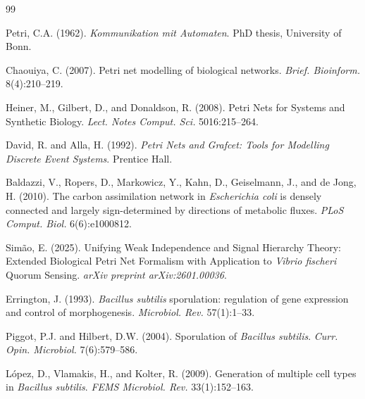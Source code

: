 \documentclass[twocolumn,11pt]{article}
\begin{document}

\begin{thebibliography}{99}
\setlength{\itemsep}{3pt}

Petri, C.A. (1962).
\newblock \textit{Kommunikation mit Automaten}.
\newblock PhD thesis, University of Bonn.

Chaouiya, C. (2007).
\newblock Petri net modelling of biological networks.
\newblock \textit{Brief. Bioinform.} 8(4):210--219.

Heiner, M., Gilbert, D., and Donaldson, R. (2008).
\newblock Petri Nets for Systems and Synthetic Biology.
\newblock \textit{Lect. Notes Comput. Sci.} 5016:215--264.

David, R. and Alla, H. (1992).
\newblock \textit{Petri Nets and Grafcet: Tools for Modelling Discrete Event Systems}.
\newblock Prentice Hall.

Baldazzi, V., Ropers, D., Markowicz, Y., Kahn, D., Geiselmann, J., and de Jong, H. (2010).
\newblock The carbon assimilation network in \textit{Escherichia coli} is densely connected and largely sign-determined by directions of metabolic fluxes.
\newblock \textit{PLoS Comput. Biol.} 6(6):e1000812.

Simão, E. (2025).
\newblock Unifying Weak Independence and Signal Hierarchy Theory: Extended Biological Petri Net Formalism with Application to \textit{Vibrio fischeri} Quorum Sensing.
\newblock \textit{arXiv preprint arXiv:2601.00036}.

Errington, J. (1993).
\newblock \textit{Bacillus subtilis} sporulation: regulation of gene expression and control of morphogenesis.
\newblock \textit{Microbiol. Rev.} 57(1):1--33.

Piggot, P.J. and Hilbert, D.W. (2004).
\newblock Sporulation of \textit{Bacillus subtilis}.
\newblock \textit{Curr. Opin. Microbiol.} 7(6):579--586.

López, D., Vlamakis, H., and Kolter, R. (2009).
\newblock Generation of multiple cell types in \textit{Bacillus subtilis}.
\newblock \textit{FEMS Microbiol. Rev.} 33(1):152--163.

\end{thebibliography}
\end{document}
